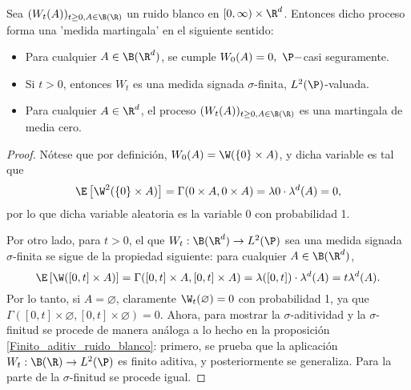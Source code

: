 \begin{prop} 
Sea $(W_t(A))_{t\geq0, A\in \B(\R)}$ un ruido blanco en $[0,\infty)\times \R^{d}$. Entonces dicho proceso forma una 'medida martingala' en el siguiente sentido:
\begin{itemize}
   \item Para cualquier $A\in \B(\R^{d})$, se cumple $W_0(A)=0, \ \P-$casi seguramente.
   \item Si $t>0$, entonces $W_t$ es una medida signada $\sigma$-finita, $L^{2}(\P)$-valuada.
   \item Para cualquier $A\in \R^{d}$, el proceso $(W_t(A))_{t\geq0, A\in \B(\R)}$ es una martingala de media cero.
\end{itemize}
\end{prop}
\begin{proof} 
 Nótese que por definición, $W_0(A)=\W(\{0\}\times A)$, y dicha variable es tal que 
 \[
 \E\left[\W^2(\{0\}\times A)\right]=\Gamma(0\times A,0\times A)=\lambda{0}\cdot\lambda^{d}(A)=0,  
 \]
 por lo que dicha variable aleatoria es la variable 0 con probabilidad 1.

 Por otro lado, para $t>0$, el que $W_t:\B(\R^{d})\to L^{2}(\P)$ sea una medida signada $\sigma$-finita se sigue de la propiedad siguiente: para cualquier $A\in \B(\R^{d})$, 
 \[
 \E\left[\W([0,t]\times A)\right]=\Gamma([0,t]\times A, [0,t]\times A)=\lambda([0,t])\cdot\lambda^{d}(A)=t\lambda^{d}(A). 
 \] 
 Por lo tanto, si $A=\varnothing$, claramente $\W_t(\varnothing)=0$ con probabilidad 1, ya que $\Gamma([0,t]\times\varnothing,[0,t]\times \varnothing)=0$. Ahora, para mostrar la $\sigma$-aditividad y la $\sigma$-finitud se procede de manera análoga a lo hecho en la proposición \ref{Finito_aditiv_ruido_blanco}: primero, se prueba que la aplicación $W_t:\B(\R)\to L^{2}(\P)$ es finito aditiva, y posteriormente se generaliza. Para la parte de la $\sigma$-finitud se procede igual.


\end{proof}
